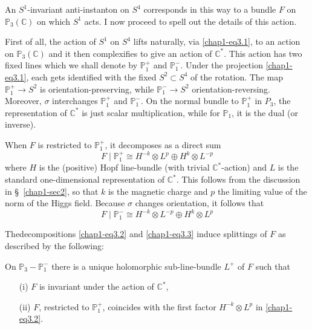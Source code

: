 An $S^{1}$-invariant anti-instanton on $S^{4}$ corresponds in this way
to a bundle $F$ on $\mathbb{P}_{3}(\mathbb{C})$ on which $S^{1}$
acts. I now proceed to spell out the details of this action.

First of all, the action of $S^{1}$ on $S^{4}$ lifts naturally, via
\eqref{chap1-eq3.1}, to an action on $\mathbb{P}_{3}(\mathbb{C})$ and
it then complexifies to give an action of $\mathbb{C}^{*}$. This
action has two fixed lines which we shall denote by
$\mathbb{P}^{+}_{1}$ and $\mathbb{P}^{-}_{1}$. Under the projection
\eqref{chap1-eq3.1}, each gets identified with the fixed $S^{2}\subset
S^{4}$ of the rotation. The map $\mathbb{P}^{+}_{1}\to S^{2}$ is
orientation-preserving, while $\mathbb{P}^{-}_{1}\to S^{2}$
orientation-reversing. Moreover, $\sigma$ interchanges
$\mathbb{P}^{+}_{1}$ and $\mathbb{P}^{-}_{1}$. On the normal bundle to
$\mathbb{P}^{+}_{1}$ in $P_{3}$, the representation of
$\mathbb{C}^{*}$ is just scalar multiplication, while for
$\mathbb{P}_{1}$, it is the dual (or inverse).

When $F$ is restricted to $\mathbb{P}^{+}_{1}$, it decomposes as a
direct sum 
\begin{equation}
F\mid \mathbb{P}^{+}_{1}\cong H^{-k}\otimes L^{p}\oplus H^{k}\otimes
L^{-p}\label{chap1-eq3.2} 
\end{equation}
where $H$ is the (positive) Hopf line-bundle (with trivial
$\mathbb{C}^{*}$-action) and $L$ is the standard one-dimensional
representation of $\mathbb{C}^{*}$. This follows from the discussion
in \S\ \ref{chap1-sec2}, so that $k$ is the magnetic charge and $p$
the limiting value of the norm of the Higgs field. Because $\sigma$
changes orientation, it follows that
\begin{equation}
F\mid \mathbb{P}^{-}_{1}\cong H^{-k}\otimes L^{-p}\oplus H^{k}\otimes
L^{p}\label{chap1-eq3.3} 
\end{equation}

The\pageoriginale decompositions \eqref{chap1-eq3.2} and
\eqref{chap1-eq3.3} induce splittings of $F$ as described by the
following:

\setcounter{theorem}{3}
\begin{proposition}\label{chap1-prop3.4}
On $\mathbb{P}_{3}-\mathbb{P}^{-}_{1}$ there is a unique holomorphic
sub-line-bundle $L^{+}$ of $F$ such that
\begin{itemize}
\item[\rm(i)] $F$ is invariant under the action of $\mathbb{C}^{*}$,

\item[\rm(ii)] $F$, restricted to $\mathbb{P}^{+}_{1}$, coincides with
  the first factor $H^{-k}\otimes L^{p}$ in \eqref{chap1-eq3.2}. 
\end{itemize}
\end{proposition}

